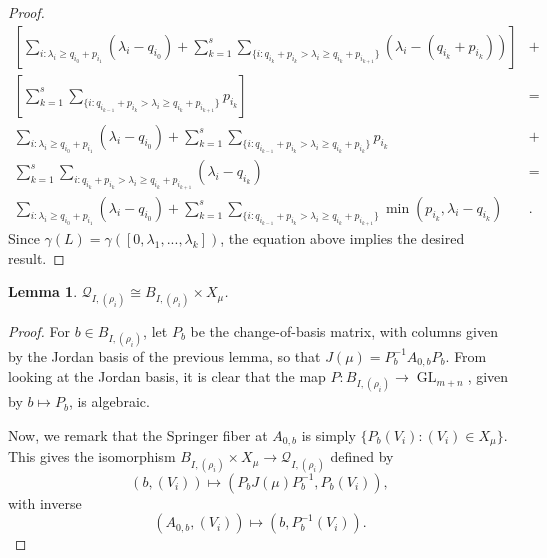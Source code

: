\documentclass[12pt,psamsfonts]{article}
\DeclareMathOperator{\GL}{GL}
\newtheorem{lemma}[theorem]{Lemma}
\begin{document}
\begin{proof}
\begin{align*}
        \left[\sum_{i : \lambda_i \geq q_{i_0} + p_{i_1}} (\lambda_i - q_{i_0}) + \sum_{k = 1}^s \sum_{\{i : q_{i_k} + p_{i_k} > \lambda_i \geq q_{i_k} + p_{i_{k + 1}}\}} (\lambda_i - (q_{i_k} + p_{i_k}))\right] & + \\
        \left[\sum_{k = 1}^s \sum_{\{i : q_{i_{k - 1}} + p_{i_k} > \lambda_i \geq q_{i_k} + p_{i_{k + 1}}\}} p_{i_k}\right] & = \\
        \sum_{i : \lambda_i \geq q_{i_0} + p_{i_1}} (\lambda_i - q_{i_0}) + \sum_{k = 1}^s \sum_{\{i : q_{i_{k - 1}} + p_{i_k} > \lambda_i \geq q_{i_k} + p_{i_k}\}} p_{i_k} & + \\
        \sum_{k = 1}^s \sum_{i : q_{i_k} + p_{i_k} > \lambda_i \geq q_{i_k} + p_{i_{k + 1}}} (\lambda_i - q_{i_k}) & = \\
        \sum_{i : \lambda_i \geq q_{i_0} + p_{i_1}} (\lambda_i - q_{i_0}) + \sum_{k = 1}^s \sum_{\{i : q_{i_{k - 1}} + p_{i_k} > \lambda_i \geq q_{i_k} + p_{i_{k + 1}}\}} \min(p_{i_k}, \lambda_i - q_{i_k}) & .
    \end{align*}
    Since \(\gamma(L) = \gamma([0, \lambda_1, ..., \lambda_k])\), the equation above implies the desired result.
\end{proof}

\begin{lemma}\label{u_i_rho_iso}
    \(\mathcal{Q}_{I, (\rho_i)} \cong B_{I, (\rho_i)} \times X_\mu\).
\end{lemma}
\begin{proof}
    For \(b \in B_{I, (\rho_i)}\), let \(P_b\) be the change-of-basis matrix, with columns given by the Jordan basis of the previous lemma, so that \(J(\mu) = P_b^{-1} A_{0,b} P_b\).
    From looking at the Jordan basis, it is clear that the map \(P : B_{I, (\rho_i)} \to \GL_{m + n}\), given by \(b \mapsto P_b\), is algebraic.
    \par Now, we remark that the Springer fiber at \(A_{0,b}\) is simply \(\{P_b (V_i) : (V_i) \in X_\mu\}\).
    This gives the isomorphism \(B_{I, (\rho_i)} \times X_\mu \to \mathcal{Q}_{I, (\rho_i)}\) defined by
    \[(b, (V_i)) \mapsto (P_b J(\mu) P_b^{-1}, P_b (V_i)),\]
    with inverse
    \[(A_{0,b}, (V_i)) \mapsto (b, P_b^{-1} (V_i)).\]
\end{proof}
\end{document}
